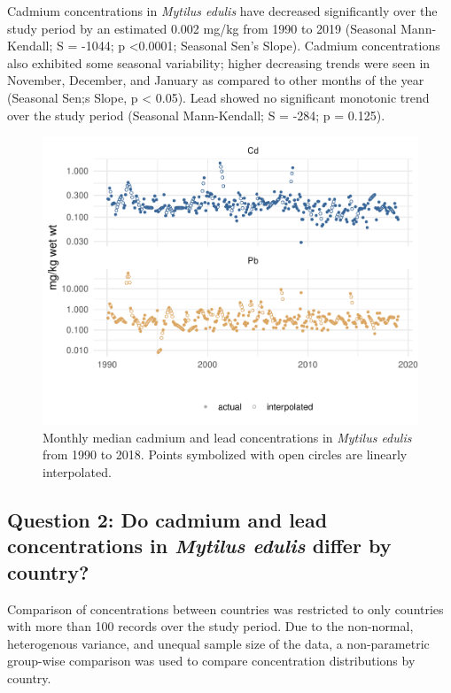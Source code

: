\documentclass[
  12pt,
]{article}
\begin{document}
Cadmium concentrations in \emph{Mytilus edulis} have decreased
significantly over the study period by an estimated 0.002 mg/kg from
1990 to 2019 (Seasonal Mann-Kendall; S = -1044; p \textless0.0001;
Seasonal Sen's Slope). Cadmium concentrations also exhibited some
seasonal variability; higher decreasing trends were seen in November,
December, and January as compared to other months of the year (Seasonal
Sen;s Slope, p \textless{} 0.05). Lead showed no significant monotonic
trend over the study period (Seasonal Mann-Kendall; S = -284; p =
0.125).

\begin{figure}
\centering
\includegraphics{McCrory_ENV972_Project_files/figure-latex/unnamed-chunk-7-1.pdf}
\caption{Monthly median cadmium and lead concentrations in \emph{Mytilus
edulis} from 1990 to 2018. Points symbolized with open circles are
linearly interpolated.}
\end{figure}

\newpage

\hypertarget{question-2-do-cadmium-and-lead-concentrations-in-mytilus-edulis-differ-by-country}{%
\subsection{\texorpdfstring{Question 2: Do cadmium and lead
concentrations in \emph{Mytilus edulis} differ by
country?}{Question 2: Do cadmium and lead concentrations in Mytilus edulis differ by country?}}\label{question-2-do-cadmium-and-lead-concentrations-in-mytilus-edulis-differ-by-country}}

Comparison of concentrations between countries was restricted to only
countries with more than 100 records over the study period. Due to the
non-normal, heterogenous variance, and unequal sample size of the data,
a non-parametric group-wise comparison was used to compare concentration
distributions by country.
\end{document}
